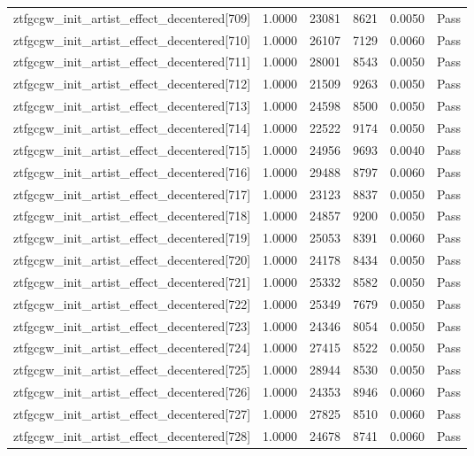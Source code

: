 \begin{table}[htbp]
\begin{tabular}{llrrll}
ztfgcgw\_init\_artist\_effect\_decentered[709] & 1.0000 & 23081 & 8621 & 0.0050 & Pass \\
ztfgcgw\_init\_artist\_effect\_decentered[710] & 1.0000 & 26107 & 7129 & 0.0060 & Pass \\
ztfgcgw\_init\_artist\_effect\_decentered[711] & 1.0000 & 28001 & 8543 & 0.0050 & Pass \\
ztfgcgw\_init\_artist\_effect\_decentered[712] & 1.0000 & 21509 & 9263 & 0.0050 & Pass \\
ztfgcgw\_init\_artist\_effect\_decentered[713] & 1.0000 & 24598 & 8500 & 0.0050 & Pass \\
ztfgcgw\_init\_artist\_effect\_decentered[714] & 1.0000 & 22522 & 9174 & 0.0050 & Pass \\
ztfgcgw\_init\_artist\_effect\_decentered[715] & 1.0000 & 24956 & 9693 & 0.0040 & Pass \\
ztfgcgw\_init\_artist\_effect\_decentered[716] & 1.0000 & 29488 & 8797 & 0.0060 & Pass \\
ztfgcgw\_init\_artist\_effect\_decentered[717] & 1.0000 & 23123 & 8837 & 0.0050 & Pass \\
ztfgcgw\_init\_artist\_effect\_decentered[718] & 1.0000 & 24857 & 9200 & 0.0050 & Pass \\
ztfgcgw\_init\_artist\_effect\_decentered[719] & 1.0000 & 25053 & 8391 & 0.0060 & Pass \\
ztfgcgw\_init\_artist\_effect\_decentered[720] & 1.0000 & 24178 & 8434 & 0.0050 & Pass \\
ztfgcgw\_init\_artist\_effect\_decentered[721] & 1.0000 & 25332 & 8582 & 0.0050 & Pass \\
ztfgcgw\_init\_artist\_effect\_decentered[722] & 1.0000 & 25349 & 7679 & 0.0050 & Pass \\
ztfgcgw\_init\_artist\_effect\_decentered[723] & 1.0000 & 24346 & 8054 & 0.0050 & Pass \\
ztfgcgw\_init\_artist\_effect\_decentered[724] & 1.0000 & 27415 & 8522 & 0.0050 & Pass \\
ztfgcgw\_init\_artist\_effect\_decentered[725] & 1.0000 & 28944 & 8530 & 0.0050 & Pass \\
ztfgcgw\_init\_artist\_effect\_decentered[726] & 1.0000 & 24353 & 8946 & 0.0060 & Pass \\
ztfgcgw\_init\_artist\_effect\_decentered[727] & 1.0000 & 27825 & 8510 & 0.0060 & Pass \\
ztfgcgw\_init\_artist\_effect\_decentered[728] & 1.0000 & 24678 & 8741 & 0.0060 & Pass \\

\end{tabular}
\end{table}
